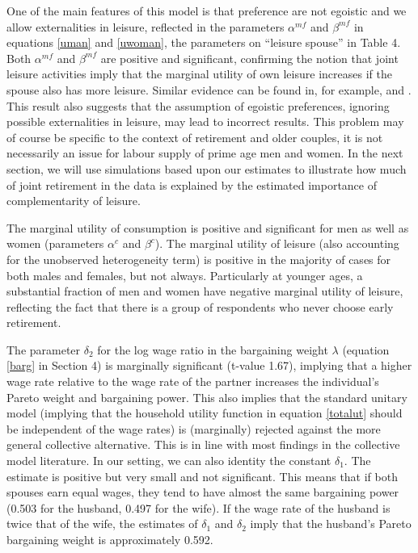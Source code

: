 \documentclass[11pt,letter]{article}
\begin{document}
One of the main features of this model is that preference are not egoistic and we allow externalities in leisure, reflected in the parameters $\alpha^{mf}$ and $\beta^{mf}$ in equations \ref{uman} and \ref{uwoman}, the parameters on ``leisure spouse'' in Table 4. Both $\alpha^{mf}$ and $\beta^{mf}$ are positive and significant, confirming the notion that joint leisure activities imply that the marginal utility of own leisure increases if the spouse also has more leisure. Similar evidence can be found in, for example, \citet{gustman2000retirement} and \citet{michaud2011}.  This result also suggests that the assumption of egoistic preferences, ignoring possible externalities in leisure, may lead to incorrect results. This problem may of course be specific to the context of retirement and older couples, it is not necessarily an issue for labour supply of prime age men and women. In the next section, we will use simulations based upon our estimates to illustrate how much of joint retirement in the data is explained by the estimated importance of complementarity of leisure.

The marginal utility of consumption is positive and significant for men as well as women (parameters $\alpha^c$ and $\beta^c$). The marginal utility of leisure (also accounting for the unobserved heterogeneity term) is positive in the majority of cases for both males and females, but not always. Particularly at younger ages, a substantial fraction of men and women have negative marginal utility of leisure, reflecting the fact that there is a group of respondents who never choose early retirement.

\par The parameter $\delta_2$ for the log wage ratio in the bargaining weight $\lambda$ (equation \ref{barg} in Section 4) is marginally significant (t-value 1.67), implying that a higher wage rate relative to the wage rate of the partner increases the individual's Pareto weight and bargaining power. This also implies that the standard unitary model (implying that the household utility function in equation \ref{totalut} should be independent of the wage rates) is (marginally) rejected against the more general collective alternative. This is in line with most findings in the collective model literature. In our setting, we can also identity the constant $\delta_{1}$. The estimate is positive but very small and not significant. This means that if both spouses earn equal wages, they tend to have almost the same bargaining power (0.503 for the husband, 0.497 for the wife). If the wage rate of the husband is twice that of the wife, the estimates of $\delta_1$ and $\delta_2$ imply that the husband's Pareto bargaining weight is approximately 0.592.
\end{document}

